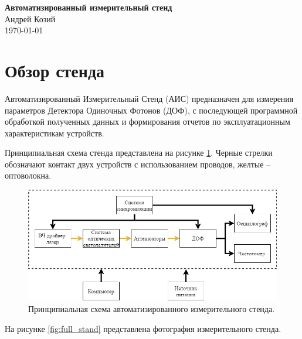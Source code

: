 \documentclass[12pt]{article}
\begin{document}

\begin{center}
    {\bf\LARGE Автоматизированный измерительный стенд} \\
    \vspace{3mm}
    {\sc  Андрей Козий} \\
    \vspace{3mm}
    \today
\end{center}

\vspace{3mm}



\section{Обзор стенда}
Автоматизированный Измерительный Стенд (АИС) предназначен для измерения параметров Детектора Одиночных Фотонов (ДОФ), с последующей программной обработкой полученных данных и формирования отчетов по эксплуатационным характеристикам устройств. 

Принципиальная схема стенда представлена на рисунке \ref{fig:stand_scheme}. Черные стрелки обозначают контакт двух устройств с использованием проводов, желтые -- оптоволокна.  

\begin{figure}[h]\centering
	\includegraphics[width=1\textwidth]{stand_scheme}
   \caption{Принципиальная схема автоматизированного измерительного стенда.}
   \label{fig:stand_scheme}
\end{figure}

На рисунке \ref{fig:full_stand} представлена фотография измерительного стенда.
\end{document}
